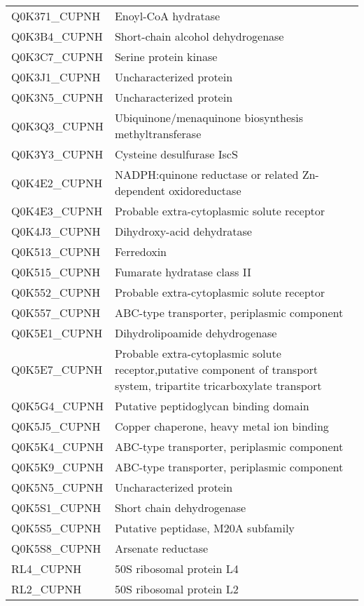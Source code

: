 \begin{center}
\begin{longtable}{ l l }
Q0K371\_CUPNH & Enoyl-CoA hydratase \\ [0.5ex]
Q0K3B4\_CUPNH & Short-chain alcohol dehydrogenase \\ [0.5ex]
Q0K3C7\_CUPNH & Serine protein kinase \\ [0.5ex]
Q0K3J1\_CUPNH & Uncharacterized protein \\ [0.5ex]
Q0K3N5\_CUPNH & Uncharacterized protein \\ [0.5ex]
Q0K3Q3\_CUPNH & Ubiquinone/menaquinone biosynthesis methyltransferase \\ [0.5ex]
Q0K3Y3\_CUPNH & Cysteine desulfurase IscS \\ [0.5ex]
Q0K4E2\_CUPNH & NADPH:quinone reductase or related Zn-dependent oxidoreductase \\ [0.5ex]
Q0K4E3\_CUPNH & Probable extra-cytoplasmic solute receptor \\ [0.5ex]
Q0K4J3\_CUPNH & Dihydroxy-acid dehydratase \\ [0.5ex]
Q0K513\_CUPNH & Ferredoxin \\ [0.5ex]
Q0K515\_CUPNH & Fumarate hydratase class II \\ [0.5ex]
Q0K552\_CUPNH & Probable extra-cytoplasmic solute receptor \\ [0.5ex]
Q0K557\_CUPNH & ABC-type transporter, periplasmic component \\ [0.5ex]
Q0K5E1\_CUPNH & Dihydrolipoamide dehydrogenase \\ [0.5ex]
Q0K5E7\_CUPNH & Probable extra-cytoplasmic solute receptor,putative component of transport system, tripartite tricarboxylate transport \\ [0.5ex]
Q0K5G4\_CUPNH & Putative peptidoglycan binding domain \\ [0.5ex]
Q0K5J5\_CUPNH & Copper chaperone, heavy metal ion binding \\ [0.5ex]
Q0K5K4\_CUPNH & ABC-type transporter, periplasmic component \\ [0.5ex]
Q0K5K9\_CUPNH & ABC-type transporter, periplasmic component \\ [0.5ex]
Q0K5N5\_CUPNH & Uncharacterized protein \\ [0.5ex]
Q0K5S1\_CUPNH & Short chain dehydrogenase \\ [0.5ex]
Q0K5S5\_CUPNH & Putative peptidase, M20A subfamily \\ [0.5ex]
Q0K5S8\_CUPNH & Arsenate reductase \\ [0.5ex]
RL4\_CUPNH & 50S ribosomal protein L4 \\ [0.5ex]
RL2\_CUPNH & 50S ribosomal protein L2 \\ [0.5ex]

\end{longtable}
\end{center}
